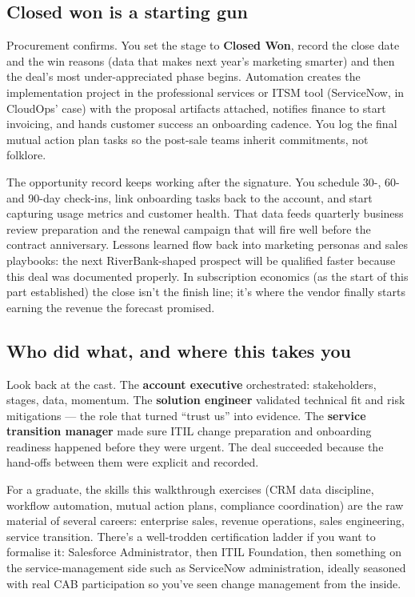 \subsection{Closed won is a starting gun}


Procurement confirms. You set the stage to \textbf{Closed Won}, record the close date and the win reasons (data that makes next year's marketing smarter) and then the deal's most under-appreciated phase begins. Automation creates the implementation project in the professional services or ITSM tool (ServiceNow, in CloudOps' case) with the proposal artifacts attached, notifies finance to start invoicing, and hands customer success an onboarding cadence. You log the final mutual action plan tasks so the post-sale teams inherit commitments, not folklore.


The opportunity record keeps working after the signature. You schedule 30-, 60- and 90-day check-ins, link onboarding tasks back to the account, and start capturing usage metrics and customer health. That data feeds quarterly business review preparation and the renewal campaign that will fire well before the contract anniversary. Lessons learned flow back into marketing personas and sales playbooks: the next RiverBank-shaped prospect will be qualified faster because this deal was documented properly. In subscription economics (as the start of this part established) the close isn't the finish line; it's where the vendor finally starts earning the revenue the forecast promised.



\subsection{Who did what, and where this takes you}


Look back at the cast. The \textbf{account executive} orchestrated: stakeholders, stages, data, momentum. The \textbf{solution engineer} validated technical fit and risk mitigations — the role that turned ``trust us'' into evidence. The \textbf{service transition manager} made sure ITIL change preparation and onboarding readiness happened before they were urgent. The deal succeeded because the hand-offs between them were explicit and recorded.


For a graduate, the skills this walkthrough exercises (CRM data discipline, workflow automation, mutual action plans, compliance coordination) are the raw material of several careers: enterprise sales, revenue operations, sales engineering, service transition. There's a well-trodden certification ladder if you want to formalise it: Salesforce Administrator, then ITIL Foundation, then something on the service-management side such as ServiceNow administration, ideally seasoned with real CAB participation so you've seen change management from the inside.



